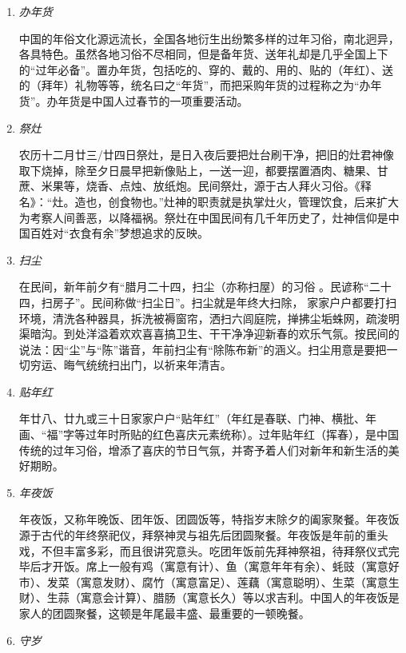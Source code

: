 \begin{enumerate}
    
\item \emph{办年货}

中国的年俗文化源远流长，全国各地衍生出纷繁多样的过年习俗，南北迥异，各具特色。虽然各地习俗不尽相同，但是备年货、送年礼却是几乎全国上下的“过年必备”。置办年货，包括吃的、穿的、戴的、用的、贴的（年红）、送的（拜年）礼物等等，统名曰之“年货”，而把采购年货的过程称之为“办年货”。办年货是中国人过春节的一项重要活动。

\item \emph{祭灶}

农历十二月廿三/廿四日祭灶，是日入夜后要把灶台刷干净，把旧的灶君神像取下烧掉，除至夕日晨早把新像贴上，一送一迎，都要摆置酒肉、糖果、甘蔗、米果等，烧香、点烛、放纸炮。民间祭灶，源于古人拜火习俗。《释名》：“灶。造也，创食物也。”灶神的职责就是执掌灶火，管理饮食，后来扩大为考察人间善恶，以降福祸。祭灶在中国民间有几千年历史了，灶神信仰是中国百姓对“衣食有余”梦想追求的反映。

\item  \emph{扫尘}

在民间，新年前夕有“腊月二十四，扫尘（亦称扫屋）的习俗 。民谚称“二十四，扫房子”。民间称做“扫尘日”。扫尘就是年终大扫除， 家家户户都要打扫环境，清洗各种器具，拆洗被褥窗帘，洒扫六闾庭院，掸拂尘垢蛛网，疏浚明渠暗沟。到处洋溢着欢欢喜喜搞卫生、干干净净迎新春的欢乐气氛。按民间的说法：因“尘”与“陈”谐音，年前扫尘有“除陈布新”的涵义。扫尘用意是要把一切穷运、晦气统统扫出门，以祈来年清吉。

\item \emph{贴年红}

年廿八、廿九或三十日家家户户“贴年红”（年红是春联、门神、横批、年画、“福”字等过年时所贴的红色喜庆元素统称）。过年贴年红（挥春），是中国传统的过年习俗，增添了喜庆的节日气氛，并寄予着人们对新年和新生活的美好期盼。

\item \emph{年夜饭}

年夜饭，又称年晚饭、团年饭、团圆饭等，特指岁末除夕的阖家聚餐。年夜饭源于古代的年终祭祀仪，拜祭神灵与祖先后团圆聚餐。年夜饭是年前的重头戏，不但丰富多彩，而且很讲究意头。吃团年饭前先拜神祭祖，待拜祭仪式完毕后才开饭。席上一般有鸡（寓意有计）、鱼（寓意年年有余）、蚝豉（寓意好市）、发菜（寓意发财）、腐竹（寓意富足）、莲藕（寓意聪明）、生菜（寓意生财）、生蒜（寓意会计算）、腊肠（寓意长久）等以求吉利。中国人的年夜饭是家人的团圆聚餐，这顿是年尾最丰盛、最重要的一顿晚餐。

\item \emph{守岁}


\end{enumerate}
